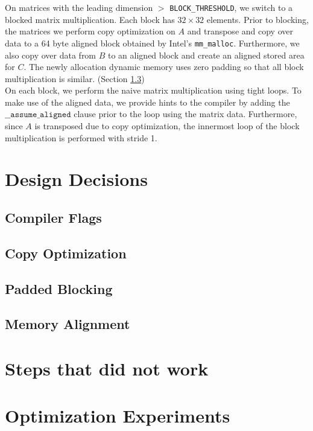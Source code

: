 \documentclass[11pt]{article}
\begin{document}
On matrices with the leading dimension $>$ \texttt{BLOCK\_THRESHOLD}, we switch to a blocked matrix multiplication. Each block has $32 \times 32$ elements. Prior to blocking, the matrices we perform copy optimization on $A$ and transpose and copy over data to a 64 byte aligned block obtained by Intel's \texttt{mm\_malloc}. Furthermore, we also copy over data from $B$ to an aligned block and create an aligned stored area for $C$. The newly allocation dynamic memory uses zero padding so that all block multiplication is similar. (Section \ref{sec:block}) \\

On each block, we perform the naive matrix multiplication using tight loops. To make use of the aligned data, we provide hints to the compiler by adding the $\texttt{\_\_assume\_aligned}$ clause prior to the loop using the matrix data. \cite{vectorization} Furthermore, since $A$ is transposed due to copy optimization, the innermost loop of the block multiplication is performed with stride 1. 



\newpage
\section{Design Decisions}
\subsection{Compiler Flags}\label{sec:comp_flags}
\subsection{Copy Optimization}\label{sec:copy_opt}
\subsection{Padded Blocking}\label{sec:block}
\subsection{Memory Alignment}\label{sec:align}

\newpage
\section{Steps that did not work}

\newpage
\section{Optimization Experiments}
\end{document}
